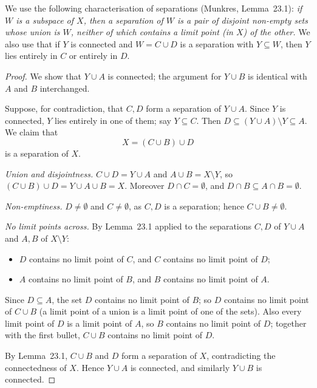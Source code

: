 
We use the following characterisation of separations (Munkres, Lemma~23.1):
\emph{if $W$ is a subspace of $X$, then a separation of $W$ is a pair of disjoint non-empty
sets whose union is $W$, neither of which contains a limit point (in $X$) of the other.}
We also use that if $Y$ is connected and $W=C\cup D$ is a separation with $Y\subseteq W$, then
$Y$ lies entirely in $C$ or entirely in $D$.

\begin{proof}
We show that $Y\cup A$ is connected; the argument for $Y\cup B$ is identical with $A$ and $B$
interchanged.

Suppose, for contradiction, that $C,D$ form a separation of $Y\cup A$. Since $Y$ is connected,
$Y$ lies entirely in one of them; say $Y\subseteq C$. Then $D\subseteq(Y\cup A)\setminus Y
\subseteq A$. We claim that
\[ X=(C\cup B)\cup D \]
is a separation of $X$.

\emph{Union and disjointness.} $C\cup D=Y\cup A$ and $A\cup B=X\setminus Y$, so
$(C\cup B)\cup D=Y\cup A\cup B=X$. Moreover $D\cap C=\emptyset$, and
$D\cap B\subseteq A\cap B=\emptyset$.

\emph{Non-emptiness.} $D\neq\emptyset$ and $C\neq\emptyset$, as $C,D$ is a separation; hence
$C\cup B\neq\emptyset$.

\emph{No limit points across.} By Lemma~23.1 applied to the separations $C,D$ of $Y\cup A$ and
$A,B$ of $X\setminus Y$:
\begin{itemize}
  \item $D$ contains no limit point of $C$, and $C$ contains no limit point of $D$;
  \item $A$ contains no limit point of $B$, and $B$ contains no limit point of $A$.
\end{itemize}
Since $D\subseteq A$, the set $D$ contains no limit point of $B$; so $D$ contains no limit point
of $C\cup B$ (a limit point of a union is a limit point of one of the sets). Also every limit
point of $D$ is a limit point of $A$, so $B$ contains no limit point of $D$; together with the
first bullet, $C\cup B$ contains no limit point of $D$.

By Lemma~23.1, $C\cup B$ and $D$ form a separation of $X$, contradicting the connectedness of
$X$. Hence $Y\cup A$ is connected, and similarly $Y\cup B$ is connected.
\end{proof}
